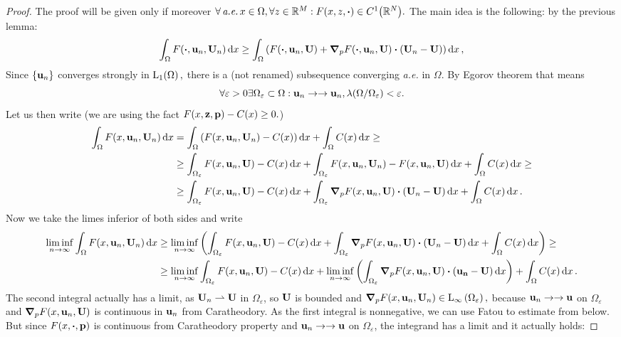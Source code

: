 \documentclass{article}
\begin{document}
\begin{proof}
	The proof will be given only if moreover $\forall \, \text{\textit{a.e.}} \,x \in \Omega, \forall z \in \R^{M}: F\qty(x,z,\vdot) \in C^1\qty(\R^N).$ The main idea is the following: by the previous lemma:
	\[
		\int_{\Omega}F\qty(\vdot, \vb{u}_n, \vb{U}_n)\dd{x} \geq \int_{\Omega}\qty(F\qty(\vdot, \vb{u}_n, \vb{U}) + \grad_p F\qty(\vdot, \vb{u}_n, \vb{U})\vdot\qty(\vb{U}_n - \vb{U}))\dd{x},
	\]
	Since $\qty{\vb{u}_n}$ converges strongly in $\LpSet[1]{\Omega},$ there is a (not renamed) subsequence converging \textit{a.e.} in $\Omega.$ By Egorov theorem that means
	\[
		\forall \varepsilon>0 \exists \Omega_{\varepsilon} \subset \Omega: \vb{u}_n \to \to \vb{u}_n, \lambda\qty(\Omega / \Omega_{\varepsilon})< \varepsilon.
	\]
	Let us then write (we are using the fact $F\qty(x, \vb{z}, \vb{p}) - C(x) \geq 0.$)
	\begin{align*}
		\int_{\Omega}F\qty(x, \vb{u}_n, \vb{U}_n)\dd{x} &= \int_{\Omega}\qty(F\qty(x, \vb{u}_n, \vb{U}_n) - C(x))\dd{x} + \int_{\Omega}C(x)\dd{x} \geq \\
		&\geq \int_{\Omega_{\varepsilon}}F\qty(x, \vb{u}_n, \vb{U}) - C(x)\dd{x} + \int_{\Omega_{\varepsilon}}F\qty(x, \vb{u}_n, \vb{U}_n) - F\qty(x, \vb{u}_n, \vb{U})\dd{x} + \int_{\Omega}C(x)\dd{x} \geq \\
		&\geq \int_{\Omega_{\varepsilon}}F\qty(x, \vb{u}_n, \vb{U}) - C(x)\dd{x} + \int_{\Omega_{\varepsilon}}\grad_p F\qty(x, \vb{u}_n, \vb{U}) \vdot \qty(\vb{U}_n - \vb{U})\dd{x} + \int_{\Omega}C(x)\dd{x}.
	\end{align*}
	Now we take the limes inferior of both sides and write 
	\begin{align*}
		\liminf_{n\to \infty}\int_{\Omega}F\qty(x, \vb{u}_n, \vb{U}_n)\dd{x} &\geq \liminf_{n \to \infty} \qty(\int_{\Omega_{\varepsilon}}F\qty(x, \vb{u}_n, \vb{U}) - C(x)\dd{x} + \int_{\Omega_{\varepsilon}}\grad_p F\qty(x, \vb{u}_n, \vb{U}) \vdot \qty(\vb{U}_n - \vb{U})\dd{x} + \int_{\Omega}C(x)\dd{x}) \geq \\
										     &\geq \liminf_{n \to \infty} \int_{\Omega_{\varepsilon}}F\qty(x, \vb{u}_n, \vb{U}) - C(x)\dd{x} + \liminf_{n\to \infty}\qty(\int_{\Omega_{\varepsilon}}\grad_p F\qty(x, \vb{u}_n, \vb{U})\vdot\qty(\vb{u_n} - \vb{U})\dd{x}) + \int_{\Omega}C(x)\dd{x}.
	\end{align*}
	The second integral actually has a limit,
	as $\vb{U}_n \rightharpoonup \vb{U}$ in $\Omega_{\varepsilon}$, so $\vb{U}$ is bounded and $\grad_p F\qty(x, \vb{u}_n, \vb{U}_n) \in \text{L}_{\infty}\!\,\left(\Omega_{\varepsilon} \right),$ because $\vb{u}_n \to \to \vb{u}$ on $\Omega_{\varepsilon}$ and $\grad_p F\qty(x, \vb{u}_n, \vb{U})$ is continuous in $\vb{u}_n$ from Caratheodory. As the first integral is nonnegative, we can use Fatou to estimate from below. But since $F(x, \vdot, \vb{p})$ is continuous from Caratheodory property and $\vb{u}_n \to \to \vb{u}$ on $\Omega_{\varepsilon}$, the integrand has a limit and it actually holds:


\end{proof}
\end{document}
